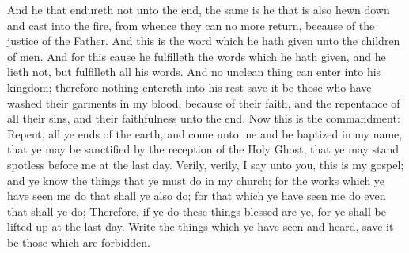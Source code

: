 And he that endureth not unto the end, the same is he that is also hewn down and cast into the fire, from whence they can no more return, because of the justice of the Father.
\bverse \iffalse And this is the word which he hath given unto the children of men. And for this cause he fulfilleth the words which he hath given, and he lieth not, but fulfilleth all his words. \fi
And this is the word which he hath given unto the children of men. And for this cause he fulfilleth the words which he hath given, and he lieth not, but fulfilleth all his words.
\bverse \iffalse And no unclean thing can enter into his kingdom; therefore nothing entereth into his rest save it be those who have washed their garments in my blood, because of their faith, and the repentance of all their sins, and their faithfulness unto the end. \fi
And no unclean thing can enter into his kingdom; therefore nothing entereth into his rest save it be those who have washed their garments in my blood, because of their faith, and the repentance of all their sins, and their faithfulness unto the end.
\bverse \iffalse Now this is the commandment: Repent, all ye ends of the earth, and come unto me and be baptized in my name, that ye may be sanctified by the reception of the Holy Ghost, that ye may stand spotless before me at the last day. \fi
Now this is the commandment: Repent, all ye ends of the earth, and come unto me and be baptized in my name, that ye may be sanctified by the reception of the Holy Ghost, that ye may stand spotless before me at the last day.
\bverse \iffalse Verily, verily, I say unto you, this is my gospel; and ye know the things that ye must do in my church; for the works which ye have seen me do that shall ye also do; for that which ye have seen me do even that shall ye do; \fi
Verily, verily, I say unto you, this is my gospel; and ye know the things that ye must do in my church; for the works which ye have seen me do that shall ye also do; for that which ye have seen me do even that shall ye do;
\bverse \iffalse Therefore, if ye do these things blessed are ye, for ye shall be lifted up at the last day. \fi
Therefore, if ye do these things blessed are ye, for ye shall be lifted up at the last day.
\bverse \iffalse Write the things which ye have seen and heard, save it be those which are forbidden. \fi
Write the things which ye have seen and heard, save it be those which are forbidden.
\bverse \iffalse Write the works of this people, which shall be, even as hath been written, of that which hath been. \fi
